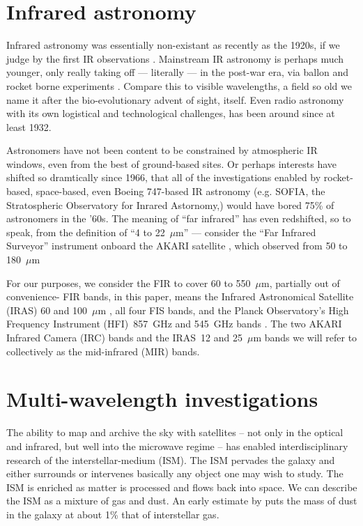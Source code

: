   \section{Infrared astronomy}

    Infrared astronomy was essentially non-existant as recently as the 1920s, if we judge by the first IR observations \citep{pettit22, pettit28}. Mainstream IR astronomy is perhaps much younger, only really taking off --- literally --- in the post-war era, via ballon and rocket borne experiments \citep{johnson66}. Compare this to visible wavelengths, a field so old we name it after the bio-evolutionary advent of sight, itself. Even radio astronomy with its own logistical and technological challenges, has been around since at least 1932.

    Astronomers have not been content to be constrained by atmospheric IR windows, even from the best of ground-based sites. Or perhaps interests have shifted so dramtically since 1966, that all of the investigations enabled by rocket-based, space-based, even Boeing 747-based IR astronomy (e.g. SOFIA, the Stratospheric Observatory for Inrared Astornomy,\cite{young12}) would have bored 75\% of astronomers in the '60s. The meaning of ``far infrared'' has even redshifted, so to speak, from the \cite{johnson66} definition of ``4 to 22~$\mu$m'' --- consider the ``Far Infrared Surveyor'' instrument onboard the AKARI satellite \citep{akari07}, which observed from 50 to 180~$\mu$m \citep{kawada07}

     For our purposes, we consider the FIR to cover 60 to 550~$\mu$m, partially out of convenience- FIR bands, in this paper, means the Infrared Astronomical Satellite (IRAS) 60 and 100~$\mu$m \citep{iras84}, all four FIS bands, and the Planck Observatory's High Frequency Instrument (HFI)~857~GHz and 545~GHz bands \citep{planckEarly11I, hfi14viii}. The two AKARI Infrared Camera (IRC) \citep{irc07,ishihara10} bands and the IRAS~12 and 25~$\mu$m bands we will refer to collectively as the mid-infrared (MIR) bands.

 \section{Multi-wavelength investigations}

     The ability to map and archive the sky with satellites -- not only in the optical and infrared, but well into the microwave regime -- has enabled interdisciplinary research of the interstellar-medium (ISM). The ISM pervades the galaxy and either surrounds or intervenes basically any object one may wish to study. The ISM is enriched as matter is processed and flows back into space. We can describe the ISM as a mixture of gas and dust. An early estimate by \cite{knapp74} puts the mass of dust in the galaxy at about 1\% that of interstellar gas.

